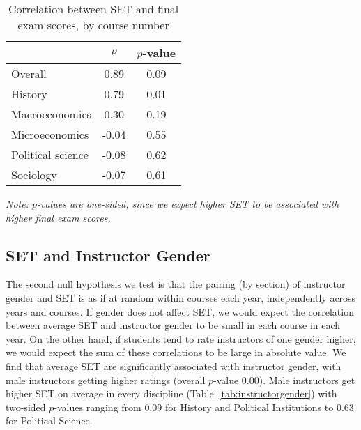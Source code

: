 \documentclass[12pt]{article}
\begin{document}
\begin{table}[htbp]
  \centering
  \footnotesize 
  \caption{Correlation between SET and final exam scores, by course number}
    \begin{tabular}{lcc}
    \toprule 
                        & $\rho$  & $p$-value  \\
   \midrule
    Overall &             0.89 &       0.09  \\
    History &             0.79 &       0.01  \\
    Macroeconomics &      0.30 &       0.19  \\
    Microeconomics &     -0.04 &       0.55  \\
    Political science &  -0.08 &       0.62  \\
    Sociology &          -0.07 &       0.61  \\
    \bottomrule
    \end{tabular}%
 \label{tab:finalexam}%
 
\textit{Note: $p$-values are one-sided, since we expect higher SET to be associated
with higher final exam scores.}
\end{table}%
\normalsize


\subsection{SET and Instructor Gender} \label{sec:Fr-set-gender}
The second null hypothesis we test is that the pairing (by section) of 
instructor gender and SET is as if at random within courses each year, independently
across years and courses.
If gender does not affect SET, we would expect the correlation between average SET
and instructor gender to be small in each course in each year.
On the other hand, if students tend to rate instructors of one gender higher, we would
expect the sum of these correlations to be large in absolute value.
We find that average SET are significantly associated with instructor gender, with male instructors
getting higher ratings (overall $p$-value 0.00). 
Male instructors get higher SET on average in every discipline  (Table~\ref{tab:instructorgender})
with two-sided $p$-values ranging from $0.09$ for History and Political Institutions to $0.63$ for Political Science.
\end{document}
